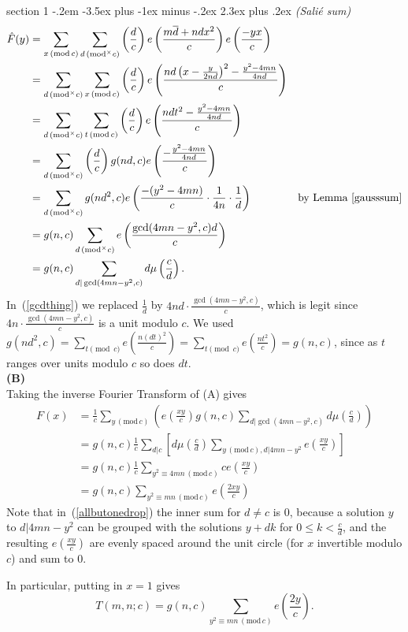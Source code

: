 \documentclass[12pt]{article}
\makeatletter
\theoremstyle{norm}
\newcommand{\rc}[1]{\frac{1}{#1}}
\newcommand{\ba}[1]{\left[ {#1} \right]}
\newcommand{\pa}[1]{\left( {#1} \right)}
\newcommand{\subprob}[1]{\noindent\textbf{#1}\\}
\newcommand{\pf}[2]{\pa{\frac{#1}{#2}}}
\newcommand{\ol}[1]{\overline{#1}}
\newcommand{\mmod}[1]{\,(\text{mod}^{\times} #1)}
\newcommand{\nmod}[1]{\,(\text{mod}\, #1)}
\newenvironment{problem}{\@startsection
       {section}
       {1}
       {-.2em}
       {-3.5ex plus -1ex minus -.2ex}
       {2.3ex plus .2ex}
       {\pagebreak[3]%
       \large\bf\noindent{Problem }
       }
       }
       {%
       }
\makeatother
\begin{document}
\begin{problem}{\it (Sali\'e sum)}
\begin{align}
\nonumber
\hat{F}(y)&=\sum_{x\nmod c} \sum_{d\mmod c} \pf dc e\pf{m\ol{d} +ndx^2}{c}e\pf{-yx}{c}\\
\nonumber
&=\sum_{d\mmod c}\sum_{x\nmod c} \pf dc e\pf
{nd\pa{x-\frac{y}{2nd}}^2-\frac{y^2-4mn}{4nd}}
{c}\\
\nonumber
&=\sum_{d\mmod c}\sum_{t\nmod c} \pf dc e\pf{ndt^2-\frac{y^2-4mn}{4nd}}
{c}\\
\nonumber
&=\sum_{d\mmod c}\pf dc g(nd,c)e\pf{-\frac{y^2-4mn}{4nd}}{c}\\
\nonumber
&=\sum_{d\mmod c}g(nd^2,c)e\pa{\frac{-(y^2-4mn)}{c}\cdot \rc{4n}\cdot \rc{d}}&\text{by Lemma~\ref{gausssum}}
\\
\label{gcdthing}
&=g(n,c)\sum_{d\mmod c}e\pa{\frac{\gcd(4mn-y^2,c)d}{c}}\\
\nonumber
&=g(n,c)\sum_{d|\gcd(4mn-y^2,c)} d\mu\pf cd.
\end{align}
In~(\ref{gcdthing}) we replaced $\rc d$ by $4nd\cdot \frac{\gcd(4mn-y^2,c)}{c}$, which is legit since $4n\cdot \frac{\gcd(4mn-y^2,c)}{c}$ is a unit modulo $c$. We used $g(nd^2,c)=\sum_{t\pmod{c}}e\pf{n(dt)^2}{c}
=\sum_{t\pmod{c}}e\pf{nt^2}{c}=g(n,c)$, since as $t$ ranges over units modulo $c$ so does $dt$.
\\

\subprob{(B)}
Taking the inverse Fourier Transform of (A) gives
\begin{align}
\nonumber
F(x)&=\rc{c}\sum_{y\nmod c} \pa{e\pf {xy}{c}
g(n,c)\sum_{d|\gcd(4mn-y^2,c)}d\mu\pf cd
}\\
\label{allbutonedrop}
&=g(n,c)\rc{c}\sum_{d|c} \ba{d\mu\pf cd \sum_{y\nmod c,d|4mn-y^2} e\pf{xy}{c}}\\
\nonumber
&=g(n,c)\rc c\sum_{y^2\equiv 4mn\nmod c}ce\pf{xy}{c}\\
\nonumber
&=g(n,c)\sum_{y^2\equiv mn\nmod c}e\pf{2xy}{c}%
\end{align}
Note that in~(\ref{allbutonedrop}) the inner sum for $d\neq c$ is 0, because a solution $y$ to $d|4 mn-y^2$ can be grouped with the solutions $y+dk$ for $0\leq k<\frac cd$, and the resulting $e\pf{xy}{c}$ are evenly spaced around the unit circle (for $x$ invertible modulo $c$) and sum to 0.

In particular, putting in $x=1$ gives
\[
T(m,n;c)=g(n,c)\sum_{y^2\equiv mn\nmod c} e\pf{2y}{c}.
\]
\end{problem}
\end{document}
